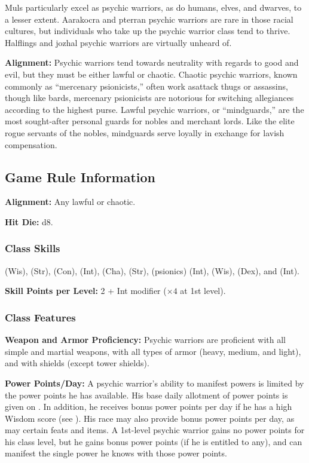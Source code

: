 Muls particularly excel as psychic warriors, as do humans, elves, and dwarves, to a lesser extent. Aarakocra and pterran psychic warriors are rare in those racial cultures, but individuals who take up the psychic warrior class tend to thrive. Halflings and jozhal psychic warriors are virtually unheard of.

\textbf{Alignment:} Psychic warriors tend towards neutrality with regards to good and evil, but they must be either lawful or chaotic. Chaotic psychic warriors, known commonly as ``mercenary psionicists,'' often work asattack thugs or assassins, though like bards, mercenary psionicists are notorious for switching allegiances according to the highest purse. Lawful psychic warriors, or ``mindguards,'' are the most sought-after personal guards for nobles and merchant lords. Like the elite rogue servants of the nobles, mindguards serve loyally in exchange for lavish compensation.

\subsection{Game Rule Information}

\textbf{Alignment:} Any lawful or chaotic.

\textbf{Hit Die:} d8.

\subsubsection{Class Skills}
 (Wis),  (Str),  (Con),  (Int),  (Cha),  (Str),  (psionics) (Int),  (Wis),  (Dex), and  (Int).

\textbf{Skill Points per Level:} 2 + Int modifier ($\times 4$ at 1st level).

\subsubsection{Class Features}

\textbf{Weapon and Armor Proficiency:} Psychic warriors are proficient with all simple and martial weapons, with all types of armor (heavy, medium, and light), and with shields (except tower shields).

\textbf{Power Points/Day:} A psychic warrior's ability to manifest powers is limited by the power points he has available. His base daily allotment of power points is given on . In addition, he receives bonus power points per day if he has a high Wisdom score (see ). His race may also provide bonus power points per day, as may certain feats and items. A 1st-level psychic warrior gains no power points for his class level, but he gains bonus power points (if he is entitled to any), and can manifest the single power he knows with those power points.

